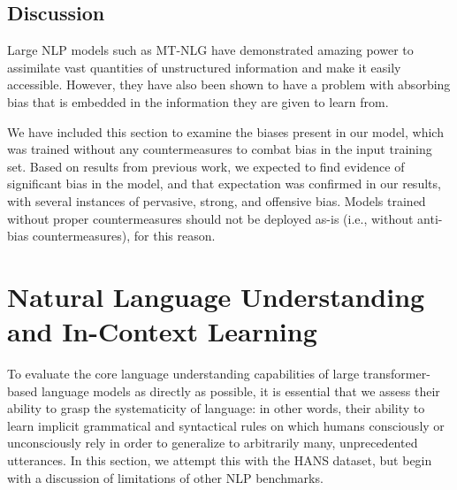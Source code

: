 \documentclass[11pt]{article}
\begin{document}
\subsection{Discussion}

Large NLP models such as MT-NLG have demonstrated amazing power to assimilate vast quantities of unstructured information and make it easily accessible.  However, they have also been shown to have a problem with absorbing bias that is embedded in the information they are given to learn from.   

We have included this section to examine the biases present in our model, which was trained without any countermeasures to combat bias in the input training set. Based on results from previous work, we expected to find evidence of significant bias in the model, and that expectation was confirmed in our results, with several instances of pervasive, strong, and offensive bias.  Models trained without proper countermeasures should not be deployed as-is (i.e., without anti-bias countermeasures), for this reason. 


\section{Natural Language Understanding and In-Context Learning}
\label{sec:hans}
To evaluate the core language understanding capabilities of large transformer-based language models as directly as possible, it is essential that we assess their ability to grasp the systematicity of language: in other words, their ability to learn implicit grammatical and syntactical rules on which humans consciously or unconsciously rely in order to generalize to arbitrarily many, unprecedented utterances.  In this section, we attempt this with the HANS dataset, but begin with a discussion of limitations of other NLP benchmarks.
\end{document}
